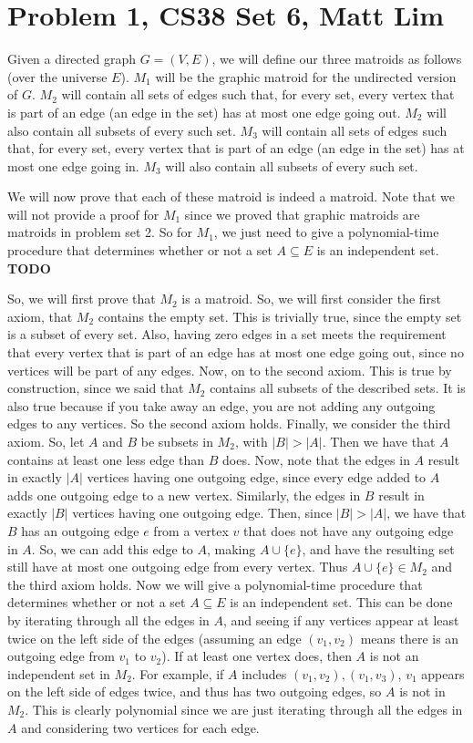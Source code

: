 \documentclass{article}
\begin{document}
\section*{Problem 1, CS38 Set 6, Matt Lim}
Given a directed graph $G = (V,E)$, we will define our three matroids as follows
(over the universe $E$). $M_1$
will be the graphic matroid for the undirected version of $G$.
$M_2$ will contain all sets of edges such
that, for every set, every vertex that is part of an edge (an edge in the set)
has at most one edge going out. $M_2$ will also contain all subsets of every such set. $M_3$
will contain all sets of edges such that, for every set, every vertex that is part of an edge
(an edge in the set) has at most one edge going in. $M_3$ will also contain all
subsets of every such set.

We will now prove that each of these matroid is indeed a matroid. Note that we
will not provide a proof for $M_1$ since we proved that graphic matroids are
matroids in problem set 2. So for $M_1$, we just need to give a polynomial-time
procedure that determines whether or not a set $A \subseteq E$ is an independent
set. \textbf{TODO}

So, we will first prove that $M_2$ is a matroid. So,
we will first consider the first axiom, that $M_2$ contains the empty set. This
is trivially true, since the empty set is a subset of every set. Also, having
zero edges in a set meets the requirement that every vertex that is part of an
edge has at most one edge going out, since no vertices will be part of any edges.
Now, on to the second axiom. This is true by construction, since we said that
$M_2$ contains all subsets of the described sets. It is also true because if you
take away an edge, you are not adding any outgoing edges to any vertices. So the
second axiom holds. Finally, we consider the third axiom. So, let $A$ and $B$ be
subsets in $M_2$, with $|B| > |A|$. Then we have that $A$ contains at least one
less edge than $B$ does. Now, note that the edges in $A$ result in exactly $|A|$
vertices having one outgoing edge, since every edge added to $A$ adds one
outgoing edge to a new vertex. Similarly, the edges in $B$ result in exactly
$|B|$ vertices having one outgoing edge. Then, since $|B| > |A|$, we have that
$B$ has an outgoing edge $e$ from a vertex $v$ that does not have any outgoing edge
in $A$. So, we can add this edge to $A$, making $A \cup \{e\}$, and have the
resulting set still have at most one outgoing edge from every vertex. Thus $A
\cup \{e\} \in M_2$ and the third axiom holds. Now we will give a
polynomial-time procedure that determines whether or not a set $A \subseteq E$ is an
independent set. This can be done by iterating through all the edges in $A$, and
seeing if any vertices appear at least twice on the left side of the
edges (assuming an edge $(v_1,
v_2)$ means there is an outgoing edge from $v_1$ to $v_2$). If at least one
vertex does, then $A$ is not an independent set in $M_2$. For example, if $A$
includes $(v_1, v_2), (v_1, v_3)$, $v_1$ appears on the left side of edges
twice, and thus has two outgoing edges, so $A$ is not in $M_2$. This is clearly
polynomial since we are just iterating through all the edges in $A$ and
considering two vertices for each edge.
\end{document}
